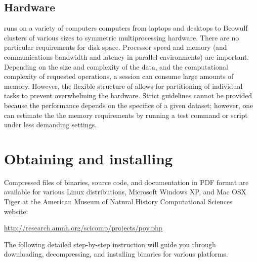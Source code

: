\subsection{Hardware}
\poy runs on a variety of computers computers from laptops and desktops to Beowulf clusters 
of various sizes to symmetric multiprocessing hardware. There are no
particular requirements for disk space. Processor speed and memory (and
communications bandwidth and latency in parallel environments) are important.
Depending on the size and complexity of the data, and the computational
complexity of requested operations, a \poy session can consume large amounts of memory.
However, the flexible structure of \poy allows for partitioning of individual
tasks to prevent overwhelming the hardware. Strict guidelines cannot be
provided because the performance depends on the specifics of a given
dataset; however, one can estimate the the memory requirements by running a test command
or script under less demanding settings.

\section{Obtaining and installing \poy}

Compressed files of \poy binaries, source code, and documentation in PDF format are available 
for various Linux distributions, Microsoft Windows XP, and Mac OSX Tiger at the American Museum 
of Natural History Computational Sciences \poy website:
\begin{center}
\url{http://research.amnh.org/scicomp/projects/poy.php}
\end{center}
The following detailed step-by-step instruction will guide you through downloading,  decompressing, and installing \poy binaries for various platforms.

